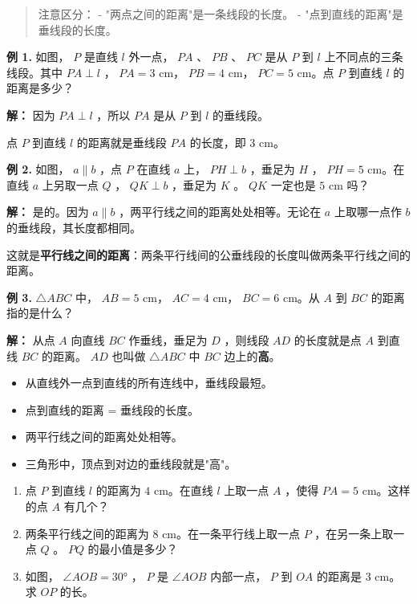 \begin{quote}
注意区分：
- "两点之间的距离"是一条线段的长度。
- "点到直线的距离"是垂线段的长度。
\end{quote}


\begin{workedexamples}


\textbf{例 1.} 如图， $P$ 是直线 $l$ 外一点， $PA$ 、 $PB$ 、 $PC$ 是从 $P$ 到 $l$ 上不同点的三条线段。其中 $PA \perp l$ ， $PA = 3$ cm， $PB = 4$ cm， $PC = 5$ cm。点 $P$ 到直线 $l$ 的距离是多少？

\textbf{解：}
因为 $PA \perp l$ ，所以 $PA$ 是从 $P$ 到 $l$ 的垂线段。

点 $P$ 到直线 $l$ 的距离就是垂线段 $PA$ 的长度，即 $3$ cm。

\textbf{例 2.} 如图， $a \parallel b$ ，点 $P$ 在直线 $a$ 上， $PH \perp b$ ，垂足为 $H$ ， $PH = 5$ cm。在直线 $a$ 上另取一点 $Q$ ， $QK \perp b$ ，垂足为 $K$ 。 $QK$ 一定也是 $5$ cm 吗？

\textbf{解：}
是的。因为 $a \parallel b$ ，两平行线之间的距离处处相等。无论在 $a$ 上取哪一点作 $b$ 的垂线段，其长度都相同。

这就是\textbf{平行线之间的距离}：两条平行线间的公垂线段的长度叫做两条平行线之间的距离。

\textbf{例 3.} $\triangle ABC$ 中， $AB = 5$ cm， $AC = 4$ cm， $BC = 6$ cm。从 $A$ 到 $BC$ 的距离指的是什么？

\textbf{解：}
从点 $A$ 向直线 $BC$ 作垂线，垂足为 $D$ ，则线段 $AD$ 的长度就是点 $A$ 到直线 $BC$ 的距离。 $AD$ 也叫做 $\triangle ABC$ 中 $BC$ 边上的\textbf{高}。

\end{workedexamples}

\begin{keytakeaway}


\begin{itemize}
  \item 从直线外一点到直线的所有连线中，垂线段最短。
  \item 点到直线的距离 = 垂线段的长度。
  \item 两平行线之间的距离处处相等。
  \item 三角形中，顶点到对边的垂线段就是"高"。
\end{itemize}


\end{keytakeaway}

\begin{practice}


\begin{enumerate}
  \item 点 $P$ 到直线 $l$ 的距离为 $4$ cm。在直线 $l$ 上取一点 $A$ ，使得 $PA = 5$ cm。这样的点 $A$ 有几个？
  \item 两条平行线之间的距离为 $8$ cm。在一条平行线上取一点 $P$ ，在另一条上取一点 $Q$ 。 $PQ$ 的最小值是多少？
  \item 如图， $\angle AOB = 30°$ ， $P$ 是 $\angle AOB$ 内部一点， $P$ 到 $OA$ 的距离是 $3$ cm。求 $OP$ 的长。
\end{enumerate}


\end{practice}



